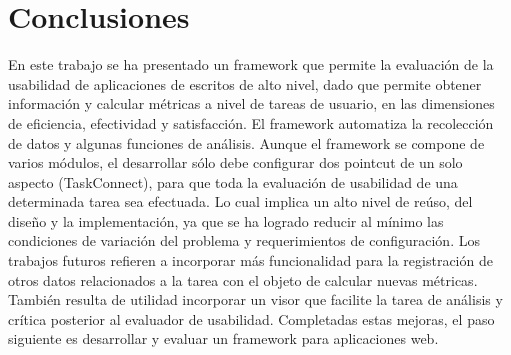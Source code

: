 \section{Conclusiones}
\label{sec:conclusiones}
En este trabajo se ha presentado un framework que permite la evaluación de la usabilidad de aplicaciones de escritos de alto nivel, dado que permite obtener información y calcular métricas a nivel de tareas de usuario, en las dimensiones de eficiencia, efectividad y satisfacción. El framework automatiza la recolección de datos y algunas funciones de análisis. Aunque el framework se compone de varios módulos, el desarrollar sólo debe configurar dos pointcut de un solo aspecto (TaskConnect), para que toda la evaluación de usabilidad de una determinada tarea sea efectuada. Lo cual implica un alto nivel de reúso, del diseño y la implementación, ya que se ha logrado reducir al mínimo las condiciones de variación del problema y requerimientos de configuración. 
Los trabajos futuros refieren a incorporar más funcionalidad para la registración de otros datos relacionados a la tarea con el objeto de calcular nuevas métricas. También resulta de utilidad incorporar un visor que facilite la tarea de análisis y crítica posterior al evaluador de usabilidad. Completadas estas mejoras, el paso siguiente es desarrollar y evaluar un framework para aplicaciones web.
